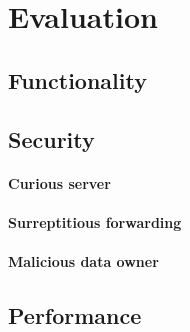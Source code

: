\documentclass[../main.tex]{subfiles}
\begin{document}
\chapter{Evaluation}

\section{Functionality}

\section{Security}
\subsubsection{Curious server}
\subsubsection{Surreptitious forwarding}
\subsubsection{Malicious data owner}

\section{Performance}
\end{document}
